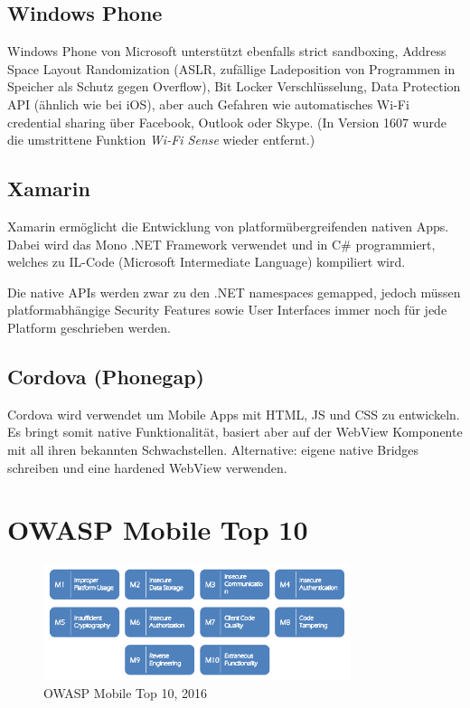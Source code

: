 \subsection{Windows Phone}
Windows Phone von Microsoft unterstützt ebenfalls strict sandboxing, Address Space Layout Randomization (ASLR, zufällige Ladeposition von Programmen in Speicher als Schutz gegen Overflow), Bit Locker Verschlüsselung, Data Protection API (ähnlich wie bei iOS), aber auch Gefahren wie automatisches Wi-Fi credential sharing über Facebook, Outlook oder Skype. (In Version 1607 wurde die umstrittene Funktion \textit{Wi-Fi Sense} wieder entfernt.)

\subsection{Xamarin}
Xamarin ermöglicht die Entwicklung von platformübergreifenden nativen Apps. Dabei wird das Mono .NET Framework verwendet und in C\# programmiert, welches zu IL-Code (Microsoft Intermediate Language) kompiliert wird.

Die native APIs werden zwar zu den .NET namespaces gemapped, jedoch müssen platformabhängige Security Features sowie User Interfaces immer noch für jede Platform geschrieben werden.

\subsection{Cordova (Phonegap)}
Cordova wird verwendet um Mobile Apps mit HTML, JS und CSS zu entwickeln. Es bringt somit native Funktionalität, basiert aber auf der WebView Komponente mit all ihren bekannten Schwachstellen. Alternative: eigene native Bridges schreiben und eine hardened WebView verwenden.

\section{OWASP Mobile Top 10}
\begin{figure}[H]
	\centering
	\includegraphics[width=0.8\textwidth]{./img/OWASP_MobileTop10}
	\caption{OWASP Mobile Top 10, 2016}
\end{figure}

